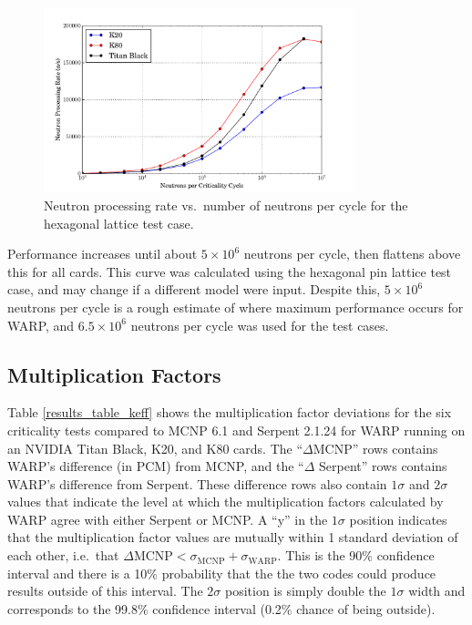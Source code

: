 \documentclass[preprint,12pt]{elsarticle}
\begin{document}
\begin{figure}[h!]
\centering
\includegraphics[width=0.8\textwidth,trim= 1cm 0cm 1cm 0cm]{graphics/scaling.pdf}
\caption{Neutron processing rate vs.\ number of neutrons per cycle for the hexagonal lattice test case. \label{scaling} }
\end{figure}

Performance increases until about $5\times10^6$ neutrons per cycle, then flattens above this for all cards.  This curve was calculated using the hexagonal pin lattice test case, and may change if a different model were input.  
Despite this, $5\times10^6$ neutrons per cycle is a rough estimate of where maximum performance occurs for WARP, and $6.5\times10^6$ neutrons per cycle was used for the test cases. 

\subsection{Multiplication Factors}

Table \ref{results_table_keff} shows the multiplication factor deviations for the six criticality tests compared to MCNP 6.1 and Serpent 2.1.24 for WARP running on an NVIDIA Titan Black, K20, and K80 cards.  The ``$\Delta$MCNP'' rows contains WARP's difference (in PCM) from MCNP, and the ``$\Delta$ Serpent'' rows contains WARP's difference from Serpent.  These difference rows also contain $1\sigma$ and $2\sigma$ values that indicate the level at which the multiplication factors calculated by WARP agree with either Serpent or MCNP.  A ``y'' in the $1\sigma$ position indicates that the multiplication factor values are mutually within 1 standard deviation of each other, i.e.\ that $\Delta \textrm{MCNP}<\sigma_{\textrm{MCNP}}+\sigma_{\textrm{WARP}}$.  This is the 90\% confidence interval and there is a 10\% probability that the the two codes could produce results outside of this interval.  The $2\sigma$ position is simply double the $1\sigma$ width and corresponds to the 99.8\% confidence interval (0.2\% chance of being outside).
\end{document}
